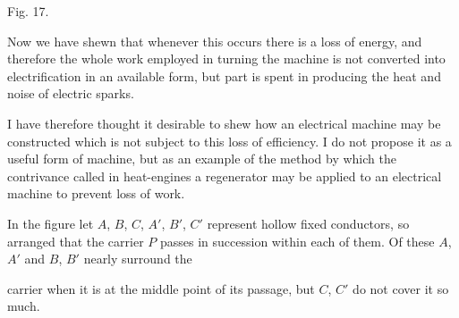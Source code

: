 \documentclass[11pt,a4paper]{article}
\begin{document}
\begin{center}

Fig. 17.
\end{center}

Now we have shewn that whenever this occurs there is a loss of energy,
and therefore the whole work employed in turning the machine is not
converted into electrification in an available form, but part is spent in
producing the heat and noise of electric sparks.

I have therefore thought it desirable to shew how an electrical machine
may be constructed which is not subject to this loss of efficiency. I do
not propose it as a useful form of machine, but as an example of the
method by which the contrivance called in heat-engines a regenerator may
be applied to an electrical machine to prevent loss of work.

In the figure let $A$, $B$, $C$, $A'$, $B'$, $C'$ represent hollow fixed
conductors, so arranged that the carrier $P$ passes in succession within
each of them. Of these $A$, $A'$ and $B$, $B'$ nearly surround the

\clearpage

carrier when it is at the middle point of its passage, but $C$, $C'$ do not
cover it so much.
\end{document}
